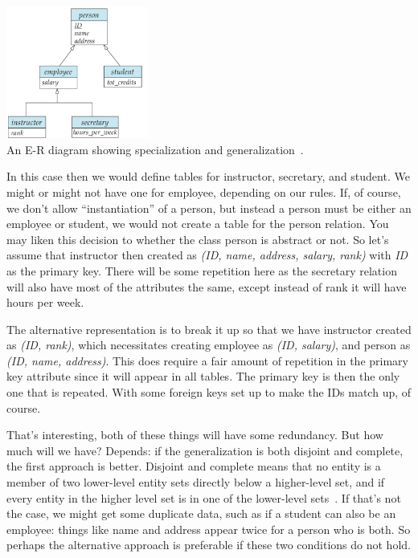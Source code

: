\begin{center}
\includegraphics[width=0.35\textwidth]{images/specialization-generalization}\\
An E-R diagram showing specialization and generalization~\cite{dsc}.
\end{center}

In this case then we would define tables for instructor, secretary, and student. We might or might not have one for employee, depending on our rules. If, of course, we don't allow ``instantiation'' of a person, but instead a person must be either an employee or student, we would not create a table for the person relation. You may liken this decision to whether the class person is abstract or not.
So let's assume that instructor then created as \textit{(ID, name, address, salary, rank)} with \textit{ID} as the primary key. There will be some repetition here as the secretary relation will also have most of the attributes the same, except instead of rank it will have hours per week.

The alternative representation is to break it up so that we have instructor created as \textit{(ID, rank)}, which necessitates creating employee as \textit{(ID, salary)}, and person as \textit{(ID, name, address)}. This does require a fair amount of repetition in the primary key attribute since it will appear in all tables. The primary key is then the only one that is repeated. With some foreign keys set up to make the IDs match up, of course.

That's interesting, both of these things will have some redundancy. But how much will we have? Depends: if the generalization is both disjoint and complete, the first approach is better. Disjoint and complete means that no entity is a member of two lower-level entity sets directly below a higher-level set, and if every entity in the higher level set is in one of the lower-level sets~\cite{dsc}. If that's not the case, we might get some duplicate data, such as if a student can also be an employee: things like name and address appear twice for a person who is both. So perhaps the alternative approach is preferable if these two conditions do not hold.

